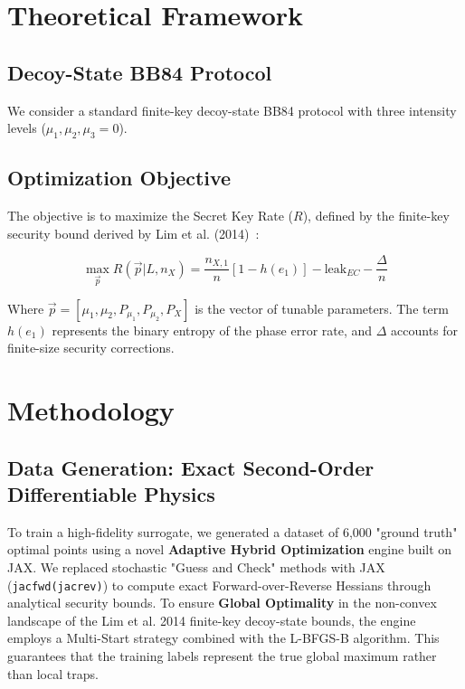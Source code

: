 \documentclass[11pt,a4paper]{article}
\begin{document}
\section{Theoretical Framework}

\subsection{Decoy-State BB84 Protocol}
We consider a standard finite-key decoy-state BB84 protocol with three intensity levels ($\mu_1, \mu_2, \mu_3=0$).

\subsection{Optimization Objective}
The objective is to maximize the Secret Key Rate ($R$), defined by the finite-key security bound derived by Lim et al. (2014)~\cite{lim2014}:

\begin{equation}
\max_{\vec{p}} R(\vec{p} | L, n_X) = \frac{n_{X,1}}{n} [1 - h(e_1)] - \text{leak}_{EC} - \frac{\Delta}{n}
\end{equation}

Where $\vec{p} = [\mu_1, \mu_2, P_{\mu_1}, P_{\mu_2}, P_X]$ is the vector of tunable parameters. The term $h(e_1)$ represents the binary entropy of the phase error rate, and $\Delta$ accounts for finite-size security corrections.

\section{Methodology}

\subsection{Data Generation: Exact Second-Order Differentiable Physics}
To train a high-fidelity surrogate, we generated a dataset of 6,000 "ground truth" optimal points using a novel \textbf{Adaptive Hybrid Optimization} engine built on JAX. We replaced stochastic "Guess and Check" methods with JAX (\texttt{jacfwd(jacrev)}) to compute exact Forward-over-Reverse Hessians through analytical security bounds. To ensure \textbf{Global Optimality} in the non-convex landscape of the Lim et al. 2014 finite-key decoy-state bounds, the engine employs a Multi-Start strategy combined with the L-BFGS-B algorithm. This guarantees that the training labels represent the true global maximum rather than local traps.
\end{document}
